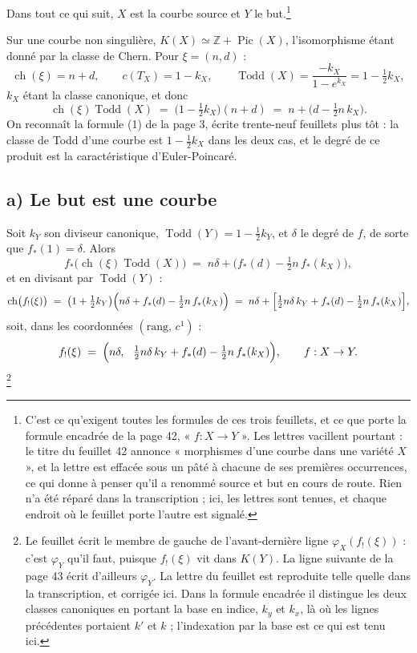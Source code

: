 \documentclass[11pt,a4paper]{article}
\begin{document}
Dans tout ce qui suit, $X$ est la courbe source et $Y$ le but.\footnote{C'est ce
qu'exigent toutes les formules de ces trois feuillets, et ce que porte la
formule encadrée de la page 42, « $f : X \to Y$ ». Les lettres vacillent
pourtant : le titre du feuillet 42 annonce « morphismes d'une courbe dans une
variété $X$ », et la lettre est effacée sous un pâté à chacune de ses premières
occurrences, ce qui donne à penser qu'il a renommé source et but en cours de
route. Rien n'a été réparé dans la transcription ; ici, les lettres sont
tenues, et chaque endroit où le feuillet porte l'autre est signalé.}

Sur une courbe non singulière, $K(X) \simeq \mathbb{Z} + \operatorname{Pic}(X)$,
l'isomorphisme étant donné par la classe de Chern. Pour $\xi = (n,d)$ :
\[
  \operatorname{ch}(\xi) = n + d,
  \qquad c(T_{X}) = 1 - k_{X},
  \qquad \operatorname{Todd}(X) = \frac{-k_{X}}{1 - e^{k_{X}}}
  = 1 - \tfrac{1}{2}k_{X},
\]
$k_{X}$ étant la classe canonique, et donc
\[
  \operatorname{ch}(\xi)\operatorname{Todd}(X)
  \;=\; \bigl(1 - \tfrac{1}{2}k_{X}\bigr)(n+d)
  \;=\; n + \bigl(d - \tfrac{1}{2}n\,k_{X}\bigr).
\]
On reconnaît la formule (1) de la page 3, écrite trente-neuf feuillets plus
tôt : la classe de Todd d'une courbe est $1 - \tfrac12 k_{X}$ dans les deux
cas, et le degré de ce produit est la caractéristique d'Euler-Poincaré.

\subsection*{a) Le but est une courbe}

Soit $k_{Y}$ son diviseur canonique, $\operatorname{Todd}(Y) = 1 -
\tfrac12 k_{Y}$, et $\delta$ le degré de $f$, de sorte que $f_{*}(1) = \delta$.
Alors
\[
  f_{*}\bigl(\operatorname{ch}(\xi)\operatorname{Todd}(X)\bigr)
  \;=\; n\delta + \bigl(f_{*}(d) - \tfrac{1}{2}n\,f_{*}(k_{X})\bigr),
\]
et en divisant par $\operatorname{Todd}(Y)$ :
\[
  \operatorname{ch}\bigl(f_{!}(\xi)\bigr)
  \;=\; \bigl(1 + \tfrac{1}{2}k_{Y}\bigr)
  \Bigl( n\delta + f_{*}(d) - \tfrac{1}{2}n\,f_{*}(k_{X}) \Bigr)
  \;=\; n\delta + \Bigl[\tfrac{1}{2}n\delta\,k_{Y} + f_{*}(d)
  - \tfrac{1}{2}n\,f_{*}(k_{X})\Bigr],
\]
soit, dans les coordonnées $(\text{rang},\, c^{1})$ :
\[
  f_{!}(\xi) \;=\; \Bigl(n\delta,\ \ \tfrac{1}{2}n\delta\,k_{Y}
  + f_{*}(d) - \tfrac{1}{2}n\,f_{*}(k_{X})\Bigr),
  \qquad f : X \to Y .
\]
\footnote{Le feuillet écrit le membre de gauche de l'avant-dernière ligne
$\varphi_{X}(f_{!}(\xi))$ : c'est $\varphi_{Y}$ qu'il faut, puisque $f_{!}(\xi)$
vit dans $K(Y)$. La ligne suivante de la page 43 écrit d'ailleurs $\varphi_{Y}$.
La lettre du feuillet est reproduite telle quelle dans la transcription, et
corrigée ici. Dans la formule encadrée il distingue les deux classes canoniques
en portant la base en indice, $k_{y}$ et $k_{x}$, là où les lignes précédentes
portaient $k'$ et $k$ ; l'indexation par la base est ce qui est tenu ici.}
\end{document}
